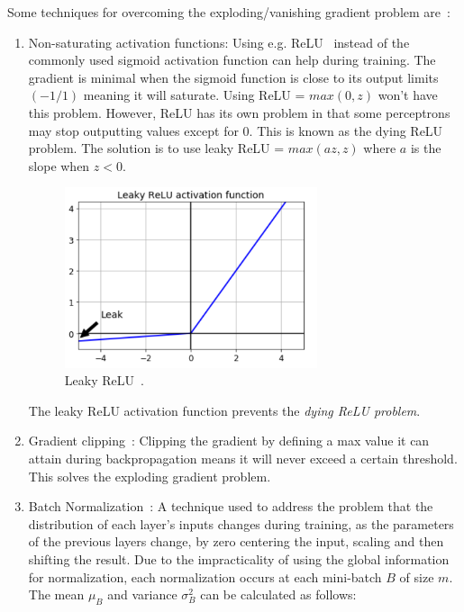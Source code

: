 \documentclass[oneside, english, bibtex]{kththesis}
\begin{document}
Some techniques for overcoming the exploding/vanishing gradient problem are~\cite{doi:10.1142/S0218488598000094}:

\begin{enumerate}
\item Non-saturating activation functions: Using e.g. ReLU~\cite{maas2013rectifier} instead of the commonly used sigmoid activation function can help during training. The gradient is minimal when the sigmoid function is close to its output limits $(-1/1)$ meaning it will saturate. Using ReLU = $max(0,z)$ won't have this problem. However, ReLU has its own problem in that some perceptrons may stop outputting values except for 0. This is known as the dying ReLU problem. The solution is to use leaky ReLU = $max(az,z)$ where $a$ is the slope when $z < 0$.

\begin{figure}[H]
  \begin{center}
    \includegraphics[width=0.7\textwidth]{figures/leaky_relu.png}
  \end{center}
  \caption{Leaky ReLU~\cite{Wang_2019}.}
  \label{fig:leaky_relu}
\end{figure}

\begin{center}
The leaky ReLU activation function prevents the \textit{dying ReLU problem}.
\end{center}

\item Gradient clipping~\cite{quintana1974clipping}: Clipping the gradient by defining a max value it can attain during backpropagation means it will never exceed a certain threshold. This solves the exploding gradient problem.

\item Batch Normalization~\cite{ioffe2015batch}: A technique used to address the problem that the distribution of each layer’s inputs changes during training, as the parameters of the previous layers change, by zero centering the input, scaling and then shifting the result. Due to the impracticality of using the global information for normalization, each normalization occurs at each mini-batch $B$ of size $m$. The mean $\mu_{B}$ and variance $\sigma_B^2$ can be calculated as follows:


\end{enumerate}
\end{document}
